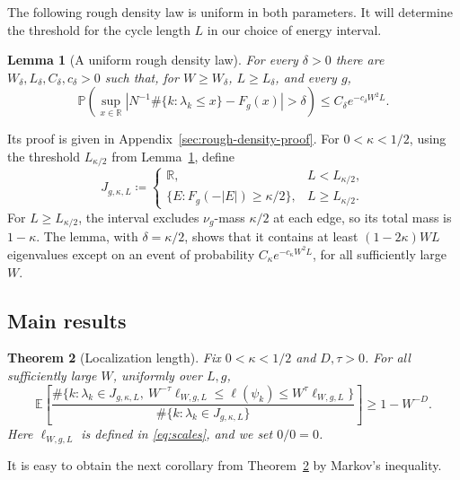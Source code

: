 \documentclass[11pt]{article}
\numberwithin{equation}{section}
\newtheorem{theorem}{Theorem}[section]
\newtheorem{lemma}[theorem]{Lemma}
\theoremstyle{remark}
\newcommand{\E}{\mathbb E}
\newcommand{\Prob}{\mathbb P}
\newcommand{\R}{\mathbb R}
\newcommand{\ellstar}{\ell_{W,g,L}}
\begin{document}
The following rough density law is uniform in both parameters. It will
determine the threshold for the cycle length $L$ in our choice of energy interval.
\begin{lemma}[A uniform rough density law]\label{lem:rough-density}
For every $\delta>0$ there are $W_\delta,L_\delta,C_\delta,c_\delta>0$
such that, for $W\ge W_\delta$, $L\ge L_\delta$, and every $g$,
\begin{equation}\label{eq:rough-counting}
 \Prob\left(\sup_{x\in\R}
 \left|N^{-1}\#\{k:\lambda_k\le x\}-F_g(x)\right|>\delta\right)
 \le C_\delta e^{-c_\delta W^2L}.
\end{equation}
\end{lemma}
Its proof is given in Appendix~\ref{sec:rough-density-proof}.
For $0<\kappa<1/2$, using the threshold $L_{\kappa/2}$
from Lemma~\ref{lem:rough-density}, define
\begin{equation}\label{eq:bulk-sampling}
 J_{g,\kappa,L}\coloneqq
 \begin{cases}
 \R, & L<L_{\kappa/2},\\
 \{E:F_g(-|E|)\ge\kappa/2\}, & L\ge L_{\kappa/2}.
 \end{cases}
\end{equation}
For $L\ge L_{\kappa/2}$, the interval excludes $\nu_g$-mass $\kappa/2$
at each edge, so its total mass is $1-\kappa$. The lemma, with
$\delta=\kappa/2$, shows that it contains at least $(1-2\kappa)WL$
eigenvalues except on an event of probability $C_\kappa e^{-c_\kappa W^2L}$,
for all sufficiently large $W$.  
 
\subsection{Main results}

\begin{theorem}[Localization length]\label{thm:main}
Fix $0<\kappa<1/2$ and $D,\tau>0$. For all sufficiently large $W$,
uniformly over $L,g$,
\begin{equation}\label{eq:main}
 \E\!\left[
 \frac{\#\{k:\lambda_k\in J_{g,\kappa,L},\ 
          W^{-\tau}\ellstar\le\ell(\psi_k)\le W^\tau\ellstar\}}
      {\#\{k:\lambda_k\in J_{g,\kappa,L}\}}
 \right]\ge 1-W^{-D}.
\end{equation}
Here $\ellstar$ is defined in \eqref{eq:scales}, and we set $0/0=0$.
\end{theorem}

It is easy to obtain the next corollary from Theorem~\ref{thm:main}
by Markov's inequality.
\end{document}
